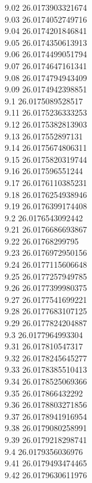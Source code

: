 {9.02	26.0173903321674\\
9.03	26.0174052749716\\
9.04	26.0174201846841\\
9.05	26.0174350613913\\
9.06	26.0174499051794\\
9.07	26.0174647161341\\
9.08	26.0174794943409\\
9.09	26.0174942398851\\
9.1	26.0175089528517\\
9.11	26.0175236333253\\
9.12	26.0175382813903\\
9.13	26.017552897131\\
9.14	26.0175674806311\\
9.15	26.0175820319744\\
9.16	26.017596551244\\
9.17	26.0176110385231\\
9.18	26.0176254938946\\
9.19	26.0176399174408\\
9.2	26.0176543092442\\
9.21	26.0176686693867\\
9.22	26.01768299795\\
9.23	26.0176972950156\\
9.24	26.0177115606648\\
9.25	26.0177257949785\\
9.26	26.0177399980375\\
9.27	26.0177541699221\\
9.28	26.0177683107125\\
9.29	26.0177824204887\\
9.3	26.0177964993304\\
9.31	26.017810547317\\
9.32	26.0178245645277\\
9.33	26.0178385510413\\
9.34	26.0178525069366\\
9.35	26.017866432292\\
9.36	26.0178803271856\\
9.37	26.0178941916954\\
9.38	26.0179080258991\\
9.39	26.0179218298741\\
9.4	26.0179356036976\\
9.41	26.0179493474465\\
9.42	26.0179630611976\\
}
